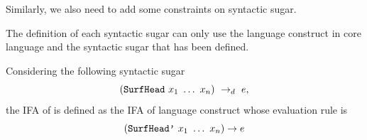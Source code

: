 Similarly, we also need to add some constraints on syntactic sugar.

\begin{Asm}
    \label{Asm:orderliness-sugar}
    The definition of each syntactic sugar can only use the language construct in core language and the syntactic sugar that has been defined.
\end{Asm}

\begin{Def}
    \label{def:ifa-sugar}
    Considering the following syntactic sugar
    \[
        (\mbox{\tt SurfHead}~x_1~\ldots~x_n) ~\rightarrow_d~ e,
    \]
    the IFA of  is defined as the IFA of language construct  whose evaluation rule is
    \[
        (\mbox{\tt SurfHead'}~x_1~\ldots~x_n) \to e
    \]

\end{Def}

